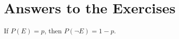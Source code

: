 \documentclass{book}
\begin{document}
\allowdisplaybreaks

\appendix

\chapter{Answers to the Exercises}\label{answers}

\renewcommand{\thechapter}{\arabic{chapter}}

\begin{answer}
If $P(E) = p$, then $P(\neg E) = 1 - p$.
\end{answer}











\end{document}
